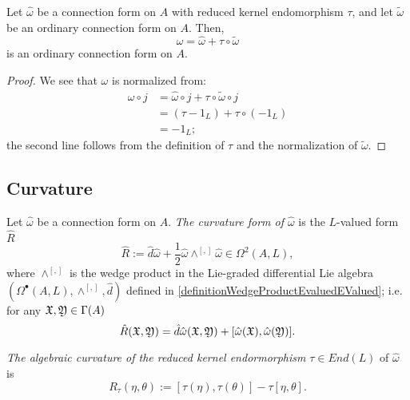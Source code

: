 \begin{proposition}\label{propositionOrdinaryConnectionInducedByBackground}
Let $\hat \omega$ be a connection form on $A$ with reduced kernel endomorphism $\tau$, and let $\tilde \omega$ be an ordinary connection form on $A$. Then,
\begin{equation}
    \omega = \hat \omega + \tau \circ \tilde \omega
\end{equation}
is an ordinary connection form on $A$.
\end{proposition}
\begin{proof}
We see that $\omega$ is normalized from:
\begin{align*}
    \omega \circ j &= \hat \omega \circ j + \tau \circ \tilde \omega \circ j\\
        &= (\tau - 1_L) + \tau \circ (-1_L) \\
        &= -1_L;
\end{align*}
the second line follows from the definition of $\tau$ and the normalization of $\tilde \omega$.
\end{proof}

\subsection{Curvature}
\begin{definition}
Let $\hat \omega$ be a connection form on $A$. \emph{The curvature form of $\hat \omega$} is the $L$-valued form $\hat R$
\begin{equation}
    \hat R := \hat d \hat \omega + \frac{1}{2} \hat \omega \wedge^{[,]} \hat \omega \in \Omega^2(A, L),
\end{equation}
where $\wedge^{[,]}$ is the wedge product in the Lie-graded differential Lie algebra $(\Omega^\bullet(A, L), \wedge^{[, ]}, \hat d)$ defined in \ref{definitionWedgeProductEvaluedEValued}; i.e. for any $\mathfrak{X}, \mathfrak{Y} \in \Gamma(A)$
\begin{equation}
    \hat R(\mathfrak{X}, \mathfrak{Y}) = \hat d \hat \omega (\mathfrak{X}, \mathfrak{Y}) + [\hat \omega(\mathfrak{X}), \hat \omega(\mathfrak{Y})].
\end{equation}

\emph{The algebraic curvature of the reduced kernel endormorphism} $\tau \in End(L)$ of $\hat \omega$ is
\begin{equation}
    R_\tau(\eta, \theta) := [\tau(\eta), \tau(\theta)] - \tau[\eta, \theta]. 
\end{equation}
\end{definition}

